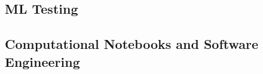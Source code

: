 \documentclass[acmsmall,screen,review,anonymous]{acmart}
\begin{document}
\subsection{ML Testing}\label{sec:ml-testing}






\subsection{Computational Notebooks and Software
  Engineering}\label{sec:notebooks}



\end{document}
